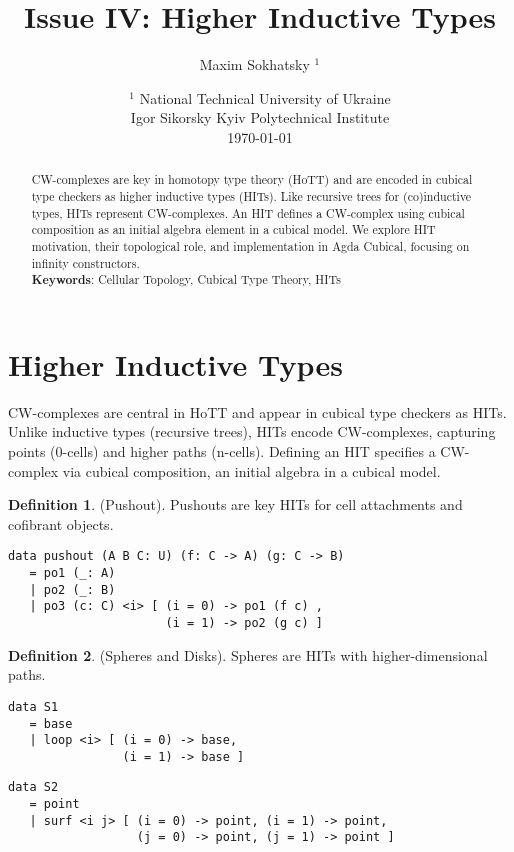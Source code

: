 \documentclass{article}
\theoremstyle{definition}
\newtheorem{definition}{Definition}
\begin{document}
\title{Issue IV: Higher Inductive Types}
\author{Maxim Sokhatsky $^1$}
\date{ $^1$ National Technical University of Ukraine \\
       \small Igor Sikorsky Kyiv Polytechnical Institute \\
       \today }

\maketitle

\begin{abstract}
CW-complexes are key in homotopy type theory (HoTT) and are
encoded in cubical type checkers as higher inductive types
(HITs). Like recursive trees for (co)inductive types, HITs
represent CW-complexes. An HIT defines a CW-complex using
cubical composition as an initial algebra element in a cubical
model. We explore HIT motivation, their topological role, and
implementation in Agda Cubical, focusing on infinity
constructors. \\
{\bf Keywords}: Cellular Topology, Cubical Type Theory, HITs
\end{abstract}
\tableofcontents

\newpage
\section{Higher Inductive Types}
CW-complexes are central in HoTT and appear in cubical type
checkers as HITs. Unlike inductive types (recursive trees),
HITs encode CW-complexes, capturing points (0-cells) and
higher paths (n-cells). Defining an HIT specifies a CW-complex
via cubical composition, an initial algebra in a cubical model.

\begin{definition} (Pushout). Pushouts are key HITs for cell
attachments and cofibrant objects.
\begin{lstlisting}
data pushout (A B C: U) (f: C -> A) (g: C -> B)
   = po1 (_: A)
   | po2 (_: B)
   | po3 (c: C) <i> [ (i = 0) -> po1 (f c) ,
                      (i = 1) -> po2 (g c) ]
\end{lstlisting}
\end{definition}

\begin{definition} (Spheres and Disks). Spheres are HITs with
higher-dimensional paths.
\begin{lstlisting}
data S1
   = base
   | loop <i> [ (i = 0) -> base,
                (i = 1) -> base ]
\end{lstlisting}
\begin{lstlisting}
data S2
   = point
   | surf <i j> [ (i = 0) -> point, (i = 1) -> point,
                  (j = 0) -> point, (j = 1) -> point ]
\end{lstlisting}
\end{definition}
\end{document}
